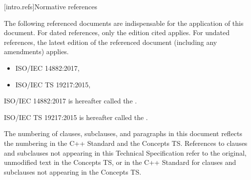 
[intro.refs]{Normative references}

\pnum
The following referenced documents are indispensable for the application of this
document. For dated references, only the edition cited applies. For undated
references, the latest edition of the referenced document (including any
amendments) applies.

\begin{itemize}
\item ISO/IEC 14882:2017, 
\item ISO/IEC TS 19217:2015, 
\end{itemize}

\pnum
ISO/IEC 14882:2017 is hereafter called the .

\pnum
ISO/IEC TS 19217:2015 is hereafter called the .

\pnum
The numbering of clauses, subclauses, and paragraphs in this document reflects
the numbering in the C++ Standard and the Concepts TS.  References to clauses
and subclauses not appearing in this Technical Specification refer to the
original, unmodified text in the Concepts TS, or in the C++ Standard for clauses
and subclauses not appearing in the Concepts TS.
